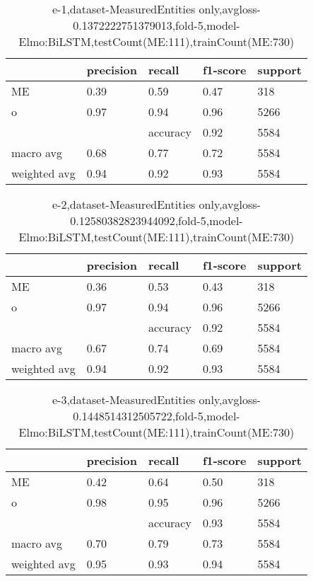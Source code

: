 \begin{table}[!ht] 
\centering
\caption{e-1,dataset-MeasuredEntities only,avgloss-0.1372222751379013,fold-5,model-Elmo:BiLSTM,testCount(ME:111),trainCount(ME:730)}\label{e-1data-meS.tsv}
\begin{tabularx}{300pt}{|X|X|X|X|X|}
\hline
&precision&recall&f1-score&support\\
\hline
ME&0.39&0.59&0.47&318\\
\hline
o&0.97&0.94&0.96&5266\\
\hline
&&accuracy&0.92&5584\\
\hline
macro avg&0.68&0.77&0.72&5584\\
\hline
weighted avg&0.94&0.92&0.93&5584\\
\hline
\end{tabularx}
\end{table}
\begin{table}[!ht] 
\centering
\caption{e-2,dataset-MeasuredEntities only,avgloss-0.12580382823944092,fold-5,model-Elmo:BiLSTM,testCount(ME:111),trainCount(ME:730)}\label{e-2data-meS.tsv}
\begin{tabularx}{300pt}{|X|X|X|X|X|}
\hline
&precision&recall&f1-score&support\\
\hline
ME&0.36&0.53&0.43&318\\
\hline
o&0.97&0.94&0.96&5266\\
\hline
&&accuracy&0.92&5584\\
\hline
macro avg&0.67&0.74&0.69&5584\\
\hline
weighted avg&0.94&0.92&0.93&5584\\
\hline
\end{tabularx}
\end{table}
\begin{table}[!ht] 
\centering
\caption{e-3,dataset-MeasuredEntities only,avgloss-0.1448514312505722,fold-5,model-Elmo:BiLSTM,testCount(ME:111),trainCount(ME:730)}\label{e-3data-meS.tsv}
\begin{tabularx}{300pt}{|X|X|X|X|X|}
\hline
&precision&recall&f1-score&support\\
\hline
ME&0.42&0.64&0.50&318\\
\hline
o&0.98&0.95&0.96&5266\\
\hline
&&accuracy&0.93&5584\\
\hline
macro avg&0.70&0.79&0.73&5584\\
\hline
weighted avg&0.95&0.93&0.94&5584\\
\hline
\end{tabularx}
\end{table}
